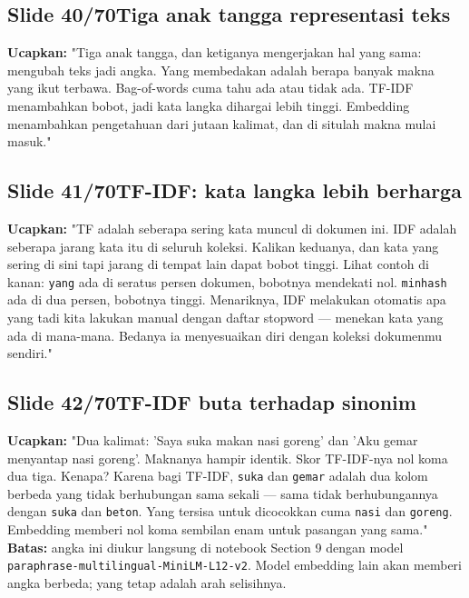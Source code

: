 \documentclass[11pt]{article}
\renewcommand{\framebox}[1]{\colorbox{acc!15}{\textcolor{acc}{\textbf{#1}}}}
\begin{document}
\subsection*{\framebox{Slide 40/70}\quad Tiga anak tangga representasi teks}
\textbf{Ucapkan:} "Tiga anak tangga, dan ketiganya mengerjakan hal yang sama: mengubah teks jadi angka. Yang membedakan adalah berapa banyak makna yang ikut terbawa. Bag-of-words cuma tahu ada atau tidak ada. TF-IDF menambahkan bobot, jadi kata langka dihargai lebih tinggi. Embedding menambahkan pengetahuan dari jutaan kalimat, dan di situlah makna mulai masuk."\\[2pt]

\subsection*{\framebox{Slide 41/70}\quad TF-IDF: kata langka lebih berharga}
\textbf{Ucapkan:} "TF adalah seberapa sering kata muncul di dokumen ini. IDF adalah seberapa jarang kata itu di seluruh koleksi. Kalikan keduanya, dan kata yang sering di sini tapi jarang di tempat lain dapat bobot tinggi. Lihat contoh di kanan: \texttt{yang} ada di seratus persen dokumen, bobotnya mendekati nol. \texttt{minhash} ada di dua persen, bobotnya tinggi. Menariknya, IDF melakukan otomatis apa yang tadi kita lakukan manual dengan daftar stopword — menekan kata yang ada di mana-mana. Bedanya ia menyesuaikan diri dengan koleksi dokumenmu sendiri."\\[2pt]

\subsection*{\framebox{Slide 42/70}\quad TF-IDF buta terhadap sinonim}
\textbf{Ucapkan:} "Dua kalimat: 'Saya suka makan nasi goreng' dan 'Aku gemar menyantap nasi goreng'. Maknanya hampir identik. Skor TF-IDF-nya nol koma dua tiga. Kenapa? Karena bagi TF-IDF, \texttt{suka} dan \texttt{gemar} adalah dua kolom berbeda yang tidak berhubungan sama sekali — sama tidak berhubungannya dengan \texttt{suka} dan \texttt{beton}. Yang tersisa untuk dicocokkan cuma \texttt{nasi} dan \texttt{goreng}. Embedding memberi nol koma sembilan enam untuk pasangan yang sama."\\[2pt]
\textbf{Batas:} angka ini diukur langsung di notebook Section 9 dengan model \texttt{paraphrase-multilingual-MiniLM-L12-v2}. Model embedding lain akan memberi angka berbeda; yang tetap adalah arah selisihnya.\\[2pt]
\end{document}
